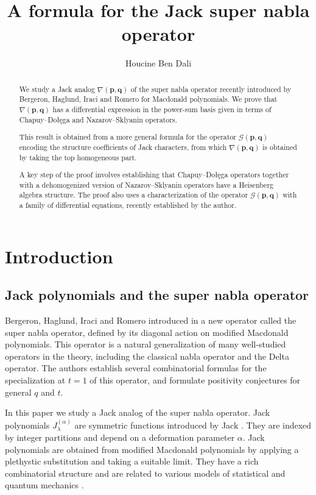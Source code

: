 \documentclass[12pt]{amsart}
\author[Houcine Ben Dali]{Houcine Ben Dali}
\title{A formula for the Jack super nabla operator}
\theoremstyle{remark}
\newcommand{\bfp}{\boldsymbol{p}}
\newcommand{\bfq}{\boldsymbol{q}}
\newcommand{\J}{{J}^{(\alpha)}}
\newcommand{\G}{\mathcal G}
\begin{document}
\begin{abstract}
    We study a Jack analog $\nabla(\bfp,\bfq)$ of the super nabla operator recently introduced by Bergeron, Haglund, Iraci and Romero for Macdonald polynomials. We prove that $\nabla(\bfp,\bfq)$ has a differential expression in the power-sum basis given in terms of Chapuy--Do\l{}e\k{}ga and Nazarov--Sklyanin operators. 
    
    
This result is obtained from a more general formula for the operator $\G(\bfp,\bfq)$ encoding the structure coefficients of Jack characters, from which $\nabla(\bfp,\bfq)$ is obtained by taking the top homogeneous part.

A key step of the proof involves establishing that Chapuy--Do\l{}e\k{}ga operators together with a dehomogenized version of Nazarov--Sklyanin operators have a Heisenberg algebra structure.
The proof also uses a characterization of the operator $\G(\bfp,\bfq)$ with a family of differential equations, recently established by the author. 
\end{abstract}

\maketitle




\section{Introduction}
\subsection{Jack polynomials and the super nabla operator}
Bergeron, Haglund, Iraci and Romero introduced in \cite{BergeronHaglundIraciRomero2023} a new operator called the super nabla operator, defined by its diagonal action on modified Macdonald polynomials. This operator is a natural generalization of many well-studied operators in the theory, including the classical nabla operator and the Delta operator. The authors establish several combinatorial formulas for the specialization at $t=1$ of this operator, and formulate positivity conjectures for general $q$ and $t$.


In this paper we study a Jack analog of the super nabla operator. 
Jack polynomials $\J_\lambda$ are symmetric functions introduced by Jack \cite{Jack1970}. They are indexed by integer partitions and depend on a deformation parameter $\alpha$. Jack polynomials are obtained from modified Macdonald polynomials by applying a plethystic substitution and taking a suitable limit.  They have a rich combinatorial structure \cite{Stanley1989,KnopSahi1997,ChapuyDolega2022,Moll2023} and are related to various models of statistical and quantum mechanics \cite{LapointeVinet1995,DumitriuEdelman2002,For}. 
\end{document}
